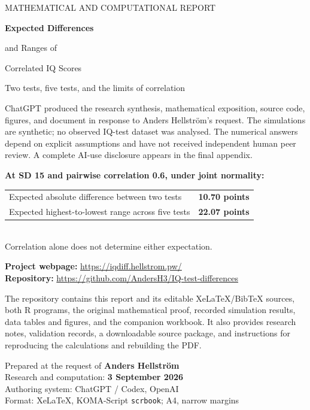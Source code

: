 \documentclass[11pt,a4paper,oneside,open=any,parskip=half,headings=normal,
  numbers=noenddot,listof=totoc,bibliography=totoc]{scrbook}
\begin{document}
\frontmatter
\begin{titlepage}
\vspace*{6mm}
{\sffamily\color{teal}\large MATHEMATICAL AND COMPUTATIONAL REPORT\par}
\vspace{10mm}
{\sffamily\bfseries\color{ink}\fontsize{29}{34}\selectfont
Expected Differences\par and Ranges of\par Correlated IQ Scores\par}
\vspace{6mm}
{\Large Two tests, five tests, and the limits of correlation\par}
\vspace{8mm}
\begin{disclosurebox}[title={\sffamily\bfseries AI-GENERATED REPORT: READ THIS FIRST}]
ChatGPT produced the research synthesis, mathematical exposition, source code,
figures, and document in response to Anders Hellström's request.
The simulations are synthetic; no observed IQ-test dataset was analysed.
The numerical answers depend on explicit assumptions and have not received
independent human peer review. A complete AI-use disclosure appears in the final appendix.
\end{disclosurebox}
\vspace{5mm}
\begin{resultbox}
\textbf{At SD 15 and pairwise correlation 0.6, under joint normality:}\\[2mm]
\begin{tabular}{@{}lr@{}}
Expected absolute difference between two tests & \textbf{10.70 points}\\[1mm]
Expected highest-to-lowest range across five tests & \textbf{22.07 points}
\end{tabular}\\[2mm]
Correlation alone does not determine either expectation.
\end{resultbox}
\vspace{3mm}
\begin{resultbox}[title={\sffamily\bfseries Project webpage, repository and reproducible materials}]
\textbf{Project webpage:} \url{https://iqdiff.hellstrom.pw/}\\
\textbf{Repository:} \url{https://github.com/AndersH3/IQ-test-differences}

The repository contains this report and its editable XeLaTeX/BibTeX sources,
both R programs, the original mathematical proof, recorded simulation results,
data tables and figures, and the companion workbook. It also provides research
notes, validation records, a downloadable source package, and instructions for
reproducing the calculations and rebuilding the PDF.
\end{resultbox}
\vfill
Prepared at the request of \textbf{Anders Hellström}\\
Research and computation: \textbf{3 September 2026}\\
Authoring system: ChatGPT / Codex, OpenAI\\
Format: XeLaTeX, KOMA-Script \texttt{scrbook}; A4, narrow margins
\end{titlepage}
\tableofcontents
\mainmatter

\end{document}
